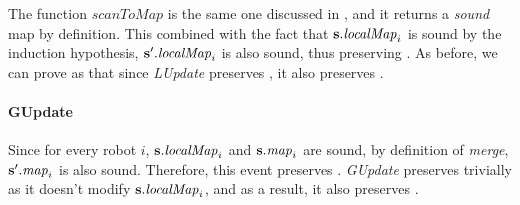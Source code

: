 The function $\mathit{scanToMap}$ is the same one discussed in , and it returns a \emph{sound} map by definition. This combined with the fact that ${\textbf{s}}.\mathit{localMap}_i$ is sound by the induction hypothesis, ${\textbf{s}}'.\mathit{localMap}_i$ is also sound, thus preserving .
As before, we can prove as that since \emph{LUpdate} preserves , it also preserves .

\paragraph{GUpdate}
Since for every robot $i$, ${\textbf{s}}.\mathit{localMap}_i$ and ${\textbf{s}}.\mathit{map}_i$ are sound, by definition of \emph{merge},  ${\textbf{s}}'.\mathit{map}_i$ is also sound. Therefore, this event preserves . \emph{GUpdate} preserves  trivially as it doesn't modify ${\textbf{s}}.\mathit{localMap}_i$, and as a result, it also preserves .


%
%




